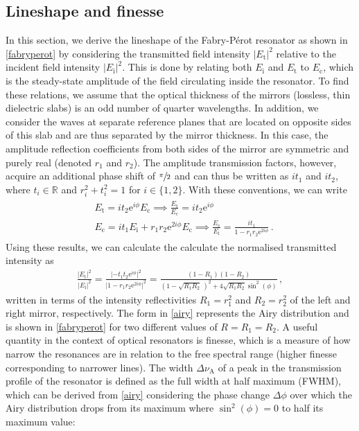 \documentclass[../Thesis-IJspeert.tex]{subfiles}
\begin{document}
\subsection{Lineshape and finesse}
In this section, we derive the lineshape of the Fabry-Pérot resonator as shown in \autoref{fabryperot} by considering the transmitted field intensity ${\lvert E_\mathrm{t}\rvert^2}$ relative to the incident field intensity ${\lvert E_\mathrm{i}\rvert^2}$. This is done by relating both $ E_\mathrm{i}$ and $ E_\mathrm{t}$ to $ E_\mathrm{c}$, which is the steady-state amplitude of the field circulating inside the resonator. To find these relations, we assume that the optical thickness of the mirrors (lossless, thin dielectric slabs) is an odd number of quarter wavelengths. In addition, we consider the waves at separate reference planes that are located on opposite sides of this slab and are thus separated by the mirror thickness. In this case, the amplitude reflection coefficients from both sides of the mirror are symmetric and purely real (denoted $r_1$ and $r_2$). The amplitude transmission factors, however, acquire an additional phase shift of $\sfrac{\pi}{2}$ and can thus be written as $it_1$ and $it_2$, where $t_i\in \mathbb{R}$ and $r_i^2+t_i^2=1$ for $i\in \{ 1,2\}$. With these conventions, we can write
\begin{align}
	\begin{split}
		&E_\mathrm{t}= it_2 \mathrm{e}^{i\phi} E_\mathrm{c} \implies \frac{E_\mathrm{t}}{E_\mathrm{c}} = it_2 \mathrm{e}^{i\phi}\\
		&E_\mathrm{c}= it_1 E_\mathrm{i} + r_1 r_2 \mathrm{e}^{2i\phi} E_\mathrm{c} \implies \frac{E_\mathrm{c}}{E_\mathrm{i}} = \frac{it_1}{1-r_1 r_2 \mathrm{e}^{2i\phi}} \,.
	\end{split}
\end{align}
Using these results, we can calculate the calculate the normalised transmitted intensity as
\begin{align}
	\label{airy}
	\frac{\lvert E_\mathrm{t}\rvert^2}{\lvert E_\mathrm{i}\rvert^2} = \frac{\lvert -t_1 t_2 \mathrm{e}^{i\phi}\rvert^2}{\lvert 1-r_1 r_2\mathrm{e}^{2i\phi}\rvert^2}=\frac{(1-R_1)(1-R_2)}{\left(1-\sqrt{R_1R_2}\,\right)^2 + 4\sqrt{R_1R_2}\sin^2(\phi)}\,,
\end{align}
written in terms of the intensity reflectivities $R_1=r_1^2$ and $R_2=r_2^2$ of the left and right mirror, respectively. The form in \autoref{airy} represents the Airy distribution and is shown in \autoref{fabryperot} for two different values of $R=R_1=R_2$. A useful quantity in the context of optical resonators is finesse, which is a measure of how narrow the resonances are in relation to the free spectral range (higher finesse corresponding to narrower lines). The width $\Delta \nu_\mathrm{A}$ of a peak in the transmission profile of the resonator is defined as the full width at half maximum (FWHM), which can be derived from \autoref{airy} considering the phase change $\Delta \phi$ over which the Airy distribution drops from its maximum where $\sin^2(\phi)=0$ to half its maximum value:
\end{document}
